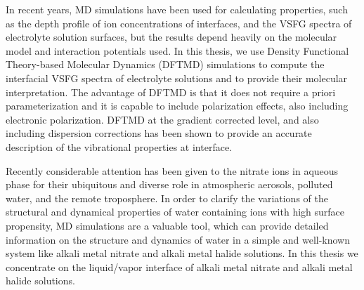 In recent years, MD simulations have been used for calculating properties, 
such as the depth profile of ion concentrations of interfaces\cite{Jungwirth2001,Jungwirth2002}, and the VSFG spectra 
of electrolyte solution surfaces\cite{Gopalakrishnan2006,Johnson2014,Ishiyama2014,Ishiyama2017},
but the results depend heavily on the molecular model and interaction potentials used\cite{LXD03,MKP04,TI07,MM05}.
In this thesis, we use Density Functional Theory-based Molecular Dynamics (DFTMD) simulations to compute 
the interfacial VSFG spectra of electrolyte solutions and to provide their molecular interpretation.
The advantage of DFTMD is that it does not require a priori parameterization and it is capable to include polarization effects\cite{Ufimtsev2011},
also including electronic polarization. DFTMD at the gradient corrected level, and also including dispersion corrections\cite{Grimme04,Grimme06,Grimme07,Grimme10,Baer2011}
has been shown to provide an accurate description of the vibrational properties at interface\cite{Fornaro2015}.

Recently considerable attention has been given to the nitrate ions in aqueous phase 
for their ubiquitous and diverse role in atmospheric aerosols, polluted water, 
and the remote troposphere\cite{XuM2009,Jubb2012}.
In order to clarify the variations of the structural and dynamical properties 
of water containing ions with high surface propensity, MD simulations are a valuable tool, 
which can provide detailed information on the structure and dynamics  
of water in a simple and well-known system like alkali metal nitrate and alkali metal halide solutions\cite{KM98}.
In this thesis we concentrate on the liquid/vapor interface of alkali metal nitrate and alkali metal halide solutions.

